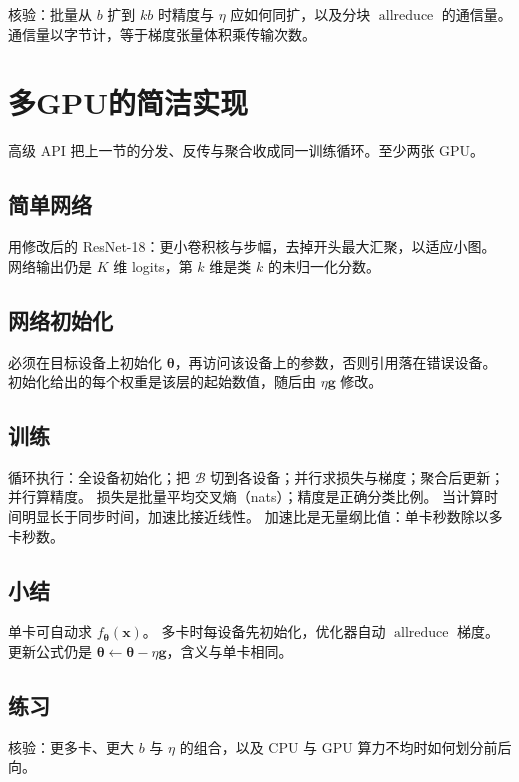 核验：批量从 $b$ 扩到 $kb$ 时精度与 $\eta$ 应如何同扩，以及分块 $\operatorname{allreduce}$ 的通信量。
通信量以字节计，等于梯度张量体积乘传输次数。

\section{多GPU的简洁实现}

高级 API 把上一节的分发、反传与聚合收成同一训练循环。至少两张 GPU。

\subsection{简单网络}

用修改后的 ResNet-18：更小卷积核与步幅，去掉开头最大汇聚，以适应小图。
网络输出仍是 $K$ 维 logits，第 $k$ 维是类 $k$ 的未归一化分数。

\subsection{网络初始化}

必须在目标设备上初始化 $\bm{\theta}$，再访问该设备上的参数，否则引用落在错误设备。
初始化给出的每个权重是该层的起始数值，随后由 $\eta\bm{g}$ 修改。

\subsection{训练}

循环执行：全设备初始化；把 $\mathcal{B}$ 切到各设备；并行求损失与梯度；聚合后更新；并行算精度。
损失是批量平均交叉熵（nats）；精度是正确分类比例。
当计算时间明显长于同步时间，加速比接近线性。
加速比是无量纲比值：单卡秒数除以多卡秒数。

\subsection{小结}

单卡可自动求 $f_{\bm{\theta}}(\bm{x})$。
多卡时每设备先初始化，优化器自动 $\operatorname{allreduce}$ 梯度。
更新公式仍是 $\bm{\theta}\leftarrow\bm{\theta}-\eta\bm{g}$，含义与单卡相同。

\subsection{练习}

核验：更多卡、更大 $b$ 与 $\eta$ 的组合，以及 CPU 与 GPU 算力不均时如何划分前后向。

